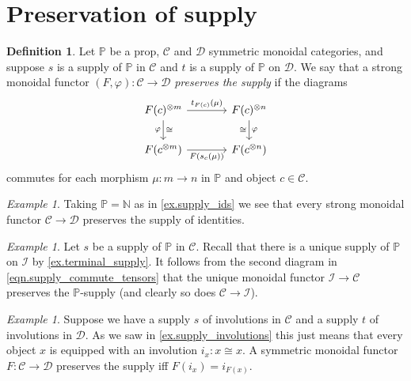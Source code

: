 \documentclass[11pt, oneside, article]{memoir}
\theoremstyle{plain}
\theoremstyle{definition}
\newtheorem{definition}[theorem]{Definition}
\theoremstyle{remark}
\newtheorem{example}[theorem]{Example}
\newcommand{\cat}[1]{\mathcal{#1}}%
\newcommand{\tpow}[1]{^{\otimes #1}}
\newcommand{\nn}{\mathbb{N}}
\newcommand{\pp}{\mathbb{P}}
\newcommand{\zero}{\cat{I}}
\begin{document}
\section{Preservation of supply}\label{sec.pres_supply}

\begin{definition}\label{def.preserve_supply}
Let $\pp$ be a prop, $\cat{C}$ and $\cat{D}$ symmetric monoidal categories, and suppose $s$ is a supply of $\pp$ in $\cat{C}$ and $t$ is a supply of $\pp$ on $\cat{D}$. We say that a strong monoidal functor $(F,\varphi)\colon\cat{C}\to\cat{D}$ \emph{preserves the supply} if the diagrams 
\begin{equation}\label{eqn.unpack_preserve_supply}
	\begin{tikzcd}[column sep=large]
  	F(c)\tpow{m}\ar[r, "t_{F(c)}(\mu)"]\ar[d, "\varphi"', "\cong"]&
  	F(c)\tpow{n}\ar[d, "\varphi", "\cong"']\\
  	F(c\tpow{m})\ar[r, "F(s_c(\mu))"']&
  	F(c\tpow{n})
  \end{tikzcd}
\end{equation}
commutes for each morphism $\mu\colon m\to n$ in $\pp$ and object $c\in\cat{C}$.
\end{definition}

\begin{example}
Taking $\pp=\nn$ as in \cref{ex.supply_ids} we see that every strong monoidal functor $\cat{C}\to\cat{D}$ preserves the supply of identities.
\end{example}

\begin{example}
Let $s$ be a supply of $\pp$ in $\cat{C}$. Recall that there is a unique supply of $\pp$ on $\zero$ by \cref{ex.terminal_supply}. It follows from the second diagram in \cref{eqn.supply_commute_tensors} that the unique monoidal functor $\zero\to\cat{C}$ preserves the $\pp$-supply (and clearly so does $\cat{C}\to\zero$).
\end{example}

\begin{example}\label{ex.preserve_involutions}
Suppose we have a supply $s$ of involutions in $\cat{C}$ and a supply $t$ of involutions in $\cat{D}$. As we saw in \cref{ex.supply_involutions} this just means that every object $x$ is equipped with an involution $i_x\colon x\cong x$. A symmetric monoidal functor $F\colon\cat{C}\to\cat{D}$ preserves the supply iff $F(i_x)=i_{F(x)}$.
\end{example}

\end{document}
